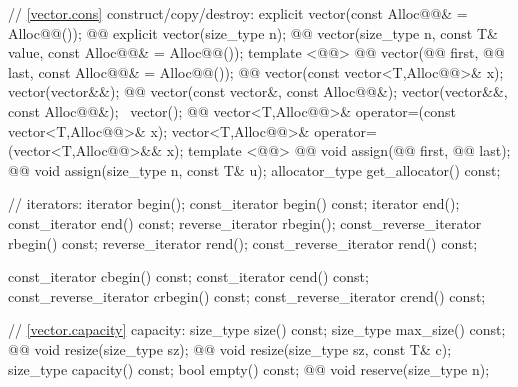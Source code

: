 \documentclass[american,twoside]{book}
\begin{document}
\begin{codeblock}
{{    // \ref{vector.cons} construct/copy/destroy:
    explicit vector(const Alloc@@& = Alloc@@());
    @@ 
      explicit vector(size_type n);
    @@ 
      vector(size_type n, const T& value, const Alloc@@& = Alloc@@());
    template <@@>
      @@
      vector(@@ first, @@ last,
             const Alloc@@& = Alloc@@());
    @@ vector(const vector<T,Alloc@@>& x);
    vector(vector&&);
    @@ vector(const vector&, const Alloc@@&);
    vector(vector&&, const Alloc@@&);
   ~vector();
    @@ 
      vector<T,Alloc@@>& operator=(const vector<T,Alloc@@>& x);
    vector<T,Alloc@@>& operator=(vector<T,Alloc@@>&& x);
    template <@@>
      @@
      void assign(@@ first, @@ last);
    @@ 
      void assign(size_type n, const T& u);
    allocator_type get_allocator() const;

    // iterators:
    iterator               begin();
    const_iterator         begin() const;
    iterator               end();
    const_iterator         end() const;
    reverse_iterator       rbegin();
    const_reverse_iterator rbegin() const;
    reverse_iterator       rend();
    const_reverse_iterator rend() const;

    const_iterator         cbegin() const;
    const_iterator         cend() const;
    const_reverse_iterator crbegin() const;
    const_reverse_iterator crend() const;

    // \ref{vector.capacity} capacity:
    size_type size() const;
    size_type max_size() const;
    @@ 
      void resize(size_type sz);
    @@ void resize(size_type sz, const T& c);
    size_type capacity() const;
    bool      empty() const;
    @@ void reserve(size_type n);

}}
\end{codeblock}
\end{document}

